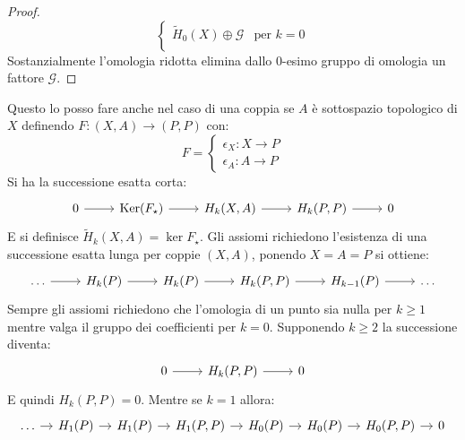 \begin{proof}
\[\begin{cases}
      \tilde{H}_0(X) \oplus \mathcal{G} & \text{per } k = 0 \\
    \end{cases}
  \]
  Sostanzialmente l'omologia ridotta elimina dallo $ 0 $-esimo
  gruppo di omologia un fattore $ \mathcal{G} $.
\end{proof}
\eproof
Questo lo posso fare anche nel caso di una coppia se $ A $ è sottospazio
  topologico di $ X $ definendo $ F \colon (X, A) \to (P,P) $ con:
  \[
    F =
    \begin{cases}
      \epsilon_X \colon X \to P \\
      \epsilon_A \colon A \to P
    \end{cases}
  \]
  Si ha la successione esatta corta:
  \[
    \begin{tikzcd}
      0 \arrow{r}{}        & \ker{F_\star} \arrow{r}{} & H_k(X, A) \arrow{r}{} & H_k(P, P) \arrow{r}{} & 0
    \end{tikzcd}
  \]
  E si definisce $ \tilde{H}_k(X,A) = \ker{F_\star} $.
  Gli assiomi richiedono l'esistenza di una successione esatta lunga per coppie $ (X,A) $,
  ponendo $ X = A = P $ si ottiene:
  \[
    \begin{tikzcd}
      \dots \arrow{r}{}        & H_k(P) \arrow{r}{}    & H_k(P) \arrow{r}{}    & H_k(P,P) \arrow{r}{}  & H_{k-1}(P) \arrow{r}{} & \dots
    \end{tikzcd}
  \]
  Sempre gli assiomi richiedono che l'omologia di un punto sia nulla per
  $ k \geq 1 $ mentre valga il gruppo dei coefficienti per $ k = 0 $. Supponendo
  $ k \geq 2 $ la successione diventa:
  \[
    \begin{tikzcd}
       0 \arrow{r}{} & H_k(P,P) \arrow{r}{}  & 0
    \end{tikzcd}
  \]
  E quindi $ H_k(P, P) = 0 $. Mentre se $ k = 1 $ allora:
  \[
    \begin{tikzcd}[nodes={column sep=10pt}]
      \dots \arrow{r}{}        & H_1(P) \arrow{r}{}    & H_1(P) \arrow{r}{}    & H_1(P,P) \arrow{r}{}  & H_{0}(P) \arrow{r}{}   &
      H_{0}(P) \arrow{r}{} & H_{0}(P,P) \rar       & 0
    \end{tikzcd}
  \]
